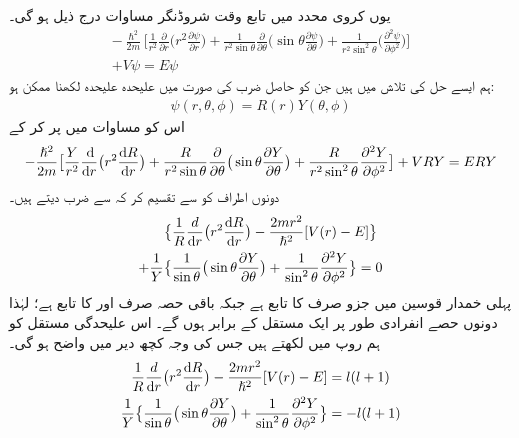 یوں کروی محدد میں تابع وقت شروڈنگر مساوات درج ذیل ہو گی۔ 
\begin{multline}\label{مساوات_ابعادی_لاپلاسی_ب}
-\frac{\hslash^{2}}{2m}\big [\frac{1}{r^{2}}\frac{\partial}{\partial{r}}\big (r^{2}\frac{\partial\psi}{\partial{r}}\big )+\frac{1}{r^{2}\sin{\theta}}\frac{\partial}{\partial{\theta}}\big(\sin{\theta}\frac{\partial\psi}{\partial{\theta}}\big )+\frac{1}{r^{2}\sin^{2}{\theta}}\big(\frac{\partial^{2}\psi}{\partial{\phi^{2}}}\big )\big ]\\
+V\psi=E\psi 
\end{multline}
ہم ایسے حل کی تلاش میں ہیں جن کو حاصل ضرب کی صورت میں علیحدہ علیحدہ لکھنا ممکن ہو:
\begin{align}
\psi(r,\theta,\phi)=R(r)Y(\theta,\phi) 
\end{align}
اس کو مساوات  میں پر کر کے
\begin{multline*}
-\frac{\hslash^{2}}{2m}\big [\frac{Y}{r^{2}}\frac{\dif}{\dif{r}}\big (r^{2}\frac{\dif{R}}{\dif{r}}\big )+\frac{R}{r^{2}\sin{\theta}}\frac{\partial}{\partial{\theta}}\big(\sin{\theta}\frac{\partial{Y}}{\partial{\theta}}\big )+\frac{R}{r^{2}\sin^{2}{\theta}}\frac{\partial^{2}{Y}}{\partial{\phi^{2}}}\big ]+VRY=ERY 
\end{multline*}
دونوں اطراف کو  سے تقسیم کر کہ  سے ضرب دیتے ہیں۔
\begin{align*}
&\big\{\frac{1}{R}\frac{d}{\dif{r}}\big(r^{2}\frac{\dif{R}}{\dif{r}}\big)-\frac{2mr^{2}}{\hslash^{2}}[V(r)-E]\big\} \\
+\frac{1}{Y}&\big\{\frac{1}{\sin{\theta}}\big(\sin{\theta}\frac{\partial{Y}}{\partial{\theta}}\big)+\frac{1}{\sin^{2}{\theta}}\frac{\partial^{2}{Y}}{\partial{\phi^{2}}}\big\}=0 
\end{align*}
پہلی خمدار قوسین میں جزو صرف  کا تابع ہے جبکہ باقی حصہ صرف     اور      کا تابع ہے؛  لہٰذا دونوں حصے انفرادی طور پر ایک مستقل کے برابر ہوں گے۔ اس علیحدگی مستقل کو ہم   روپ میں لکھتے ہیں جس کی وجہ کچھ دیر میں واضح ہو گی۔
\begin{align}
\frac{1}{R}\frac{d}{\dif{r}}\big(r^{2}\frac{\dif{R}}{\dif{r}}\big)-\frac{2mr^{2}}{\hslash^{2}}[V(r)-E]&=l(l+1)\label{مساوات_ابعاد_رداسی_الف} \\ 
\frac{1}{Y}\big\{\frac{1}{\sin{\theta}}\big(\sin{\theta}\frac{\partial{Y}}{\partial{\theta}}\big)+\frac{1}{\sin^{2}{\theta}}\frac{\partial^{2}{Y}}{\partial{\phi^{2}}}\big\}&=-l(l+1) \label{مساوات_ابعاد_غیر_رداسی_الف}
\end{align}
